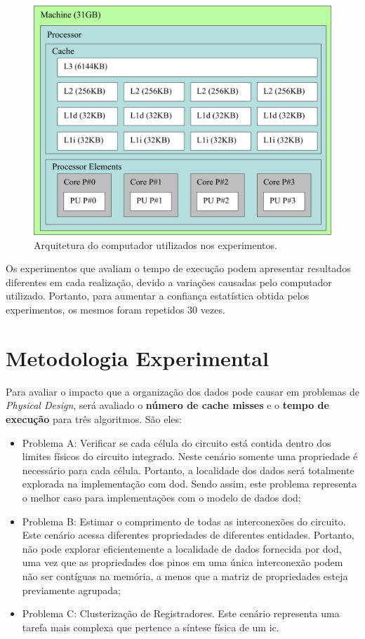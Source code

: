 \begin{figure}[ht]
    \centering
    \includegraphics[width=0.5\linewidth]{img/results/architectureMemoryZeus.pdf}
    \caption{Arquitetura do computador utilizados nos experimentos.}
    \label{fig:architectureMemoryZeus}
\end{figure}

Os experimentos que avaliam o tempo de execução podem apresentar resultados diferentes em cada realização, devido a variações causadas pelo computador utilizado. Portanto, para aumentar a confiança estatística obtida pelos experimentos, os mesmos foram repetidos 30 vezes.%

\section{Metodologia Experimental}
\label{sec:metodologia_experimental}

Para avaliar o impacto que a organização dos dados pode causar em problemas de \textit{Physical Design}, será avaliado o \textbf{número de cache misses} e o \textbf{tempo de execução} para três algoritmos. São eles:
\begin{itemize}
    \item Problema A: Verificar se cada célula do circuito está contida dentro dos  limites físicos do circuito integrado. Neste cenário somente uma propriedade é necessário para cada célula. Portanto, a localidade dos dados será totalmente explorada na implementação com \ac{dod}. Sendo assim, este problema representa o melhor caso para implementações com o modelo de dados \ac{dod};
    \item Problema B: Estimar o comprimento de todas as interconexões do circuito. Este cenário acessa diferentes propriedades de diferentes entidades. Portanto, não pode explorar eficientemente a localidade de dados fornecida por \ac {dod}, uma vez que as propriedades dos pinos em uma única interconexão podem não ser contíguas na memória, a menos que a matriz de propriedades esteja previamente agrupada;
    \item Problema C: Clusterização de Registradores. Este cenário representa uma tarefa mais complexa que pertence a síntese física de um \ac{ic}.
\end{itemize}

